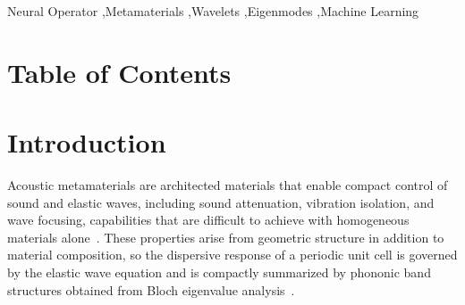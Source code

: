 \documentclass[preprint,review,12pt,numafflabel]{elsarticle}
\begin{document}
\begin{frontmatter}
\begin{abstract}
\end{abstract}



\begin{keyword}
Neural Operator \sep Metamaterials \sep Wavelets \sep Eigenmodes \sep Machine Learning


\end{keyword}

\end{frontmatter}



\newpage
\section*{Table of Contents}
\begingroup
  \renewcommand{\contentsname}{}
  \tableofcontents
\endgroup
\newpage
\section{Introduction}
\label{introduction}

Acoustic metamaterials are architected materials that enable compact control of sound and elastic waves, including sound attenuation, vibration isolation, and wave focusing, capabilities that are difficult to achieve with homogeneous materials alone~\cite{cummer2016controlling,liao2021acoustic}. These properties arise from geometric structure in addition to material composition, so the dispersive response of a periodic unit cell is governed by the elastic wave equation and is compactly summarized by phononic band structures obtained from Bloch eigenvalue analysis~\cite{kushwaha1993acoustic,hussein2014dynamics}.
\end{document}
